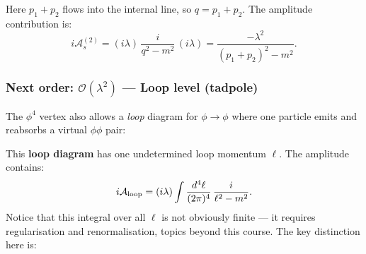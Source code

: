 \documentclass[../main.tex]{subfiles}
\begin{document}
Here $p_1 + p_2$ flows into the internal line, so $q = p_1 + p_2$.  The amplitude contribution is:
\begin{equation}
  i\mathcal{A}_s^{(2)}
  = (i\lambda)\,\frac{i}{q^2 - m^2}\,(i\lambda)
  = \frac{-\lambda^2}{(p_1+p_2)^2 - m^2}.
  \label{eq:lec05:phi4-s}
\end{equation}

\subsubsection*{Next order: $\mathcal{O}(\lambda^2)$ — Loop level (tadpole)}

The $\phi^4$ vertex also allows a \emph{loop} diagram for $\phi \to \phi$ where one particle emits and reabsorbs a virtual $\phi\phi$ pair:

\begin{center}
\end{center}

This \textbf{loop diagram} has one undetermined loop momentum $\ell$.  The amplitude contains:
\begin{equation}
  i\mathcal{A}_{\rm loop}
  = (i\lambda)\int \frac{d^4\ell}{(2\pi)^4}\, \frac{i}{\ell^2 - m^2}.
  \label{eq:lec05:phi4-loop}
\end{equation}
Notice that this integral over all $\ell$ is not obviously finite — it requires regularisation and renormalisation, topics beyond this course.  The key distinction here is:


\end{document}
